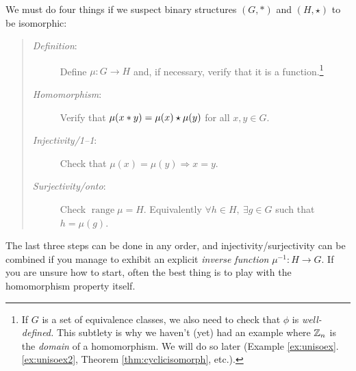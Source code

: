 \vspace{-5pt}


We must do four things if we suspect binary structures $(G,*)$ and $(H,\star)$ to be isomorphic:
\begin{quote}
	\begin{description}
		\item[\emph{Definition}:] Define $\mu:G\to H$ and, if necessary, verify that it is a function.\footnote{%
			If $G$ is a set of equivalence classes, we also need to check that $\phi$ is \emph{well-defined.} This subtlety is why we haven't (yet) had an example where $\mathbb{Z}_n$ is the \emph{domain} of a homomorphism. We will do so later (Example \ref*{ex:unisoex}.\ref{ex:unisoex2}, Theorem \ref{thm:cyclicisomorph}, etc.).
			}
		\item[\emph{Homomorphism}:] Verify that $\mu(x\mathbin{\ast} y)=\mu(x)\mathbin{\star}\mu(y)$ for all $x,y\in G$.
		\item[\emph{Injectivity/1--1}:] Check that $\mu(x)=\mu(y)\Longrightarrow x=y$.
		\item[\emph{Surjectivity/onto}:] Check $\operatorname{range}\mu=H$. Equivalently $\forall h\in H,\ \exists g\in G$ such that $h=\mu(g)$.
	\end{description}
\end{quote}

The last three steps can be done in any order, and injectivity/surjectivity can be combined if you manage to exhibit an explicit \emph{inverse function} $\mu^{-1}:H\to G$. If you are unsure how to start, often the best thing is to play with the homomorphism property itself.


